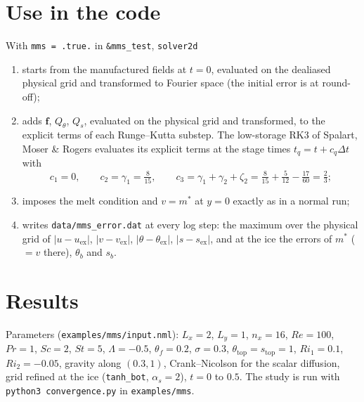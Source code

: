 \documentclass[11pt,a4paper]{article}
\begin{document}
\section{Use in the code}

With \texttt{mms = .true.} in \texttt{\&mms\_test}, \texttt{solver2d}
\begin{enumerate}
  \item starts from the manufactured fields at $t=0$, evaluated on the dealiased physical grid and
        transformed to Fourier space (the initial error is at round-off);
  \item adds $\mathbf f$, $Q_\theta$, $Q_s$, evaluated on the physical grid and transformed, to the explicit
        terms of each Runge--Kutta substep. The low-storage RK3 of Spalart, Moser \& Rogers evaluates its
        explicit terms at the stage times $t_q = t + c_q\Delta t$ with
        \begin{equation*}
          c_1 = 0,\qquad c_2 = \gamma_1 = \tfrac{8}{15},\qquad
          c_3 = \gamma_1 + \gamma_2 + \zeta_2 = \tfrac8{15} + \tfrac5{12} - \tfrac{17}{60} = \tfrac23 ;
        \end{equation*}
  \item imposes the melt condition and $v=m^*$ at $y=0$ exactly as in a normal run;
  \item writes \texttt{data/mms\_error.dat} at every log step: the maximum over the physical grid of
        $|u-u_{\mathrm{ex}}|$, $|v-v_{\mathrm{ex}}|$, $|\theta-\theta_{\mathrm{ex}}|$, $|s-s_{\mathrm{ex}}|$, and at the
        ice the errors of $m^*$ ($=v$ there), $\theta_b$ and $s_b$.
\end{enumerate}

\section{Results}

Parameters (\texttt{examples/mms/input.nml}): $L_x=2$, $L_y=1$, $n_x=16$, $Re=100$, $Pr=1$, $Sc=2$,
$St=5$, $\Lambda=-0.5$, $\theta_f=0.2$, $\sigma=0.3$, $\theta_{\mathrm{top}}=s_{\mathrm{top}}=1$,
$Ri_1=0.1$, $Ri_2=-0.05$, gravity along $(0.3,1)$, Crank--Nicolson for the scalar diffusion, grid refined at the
ice (\texttt{tanh\_bot}, $\alpha_s=2$), $t=0$ to $0.5$. The study is run with
\texttt{python3 convergence.py} in \texttt{examples/mms}.
\end{document}
